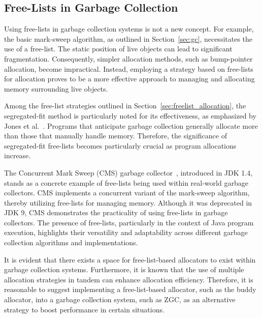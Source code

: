 \subsection{Free-Lists in Garbage Collection}

Using free-lists in garbage collection systems is not a new concept. For example, the basic mark-sweep algorithm, as outlined in Section~\ref{sec:gc}, necessitates the use of a free-list. The static position of live objects can lead to significant fragmentation. Consequently, simpler allocation methods, such as bump-pointer allocation, become impractical. Instead, employing a strategy based on free-lists for allocation proves to be a more effective approach to managing and allocating memory surrounding live objects.

Among the free-list strategies outlined in Section~\ref{sec:freelist_allocation}, the segregated-fit method is particularly noted for its effectiveness, as emphasized by Jones et al.~\cite{gchandbook}. Programs that anticipate garbage collection generally allocate more than those that manually handle memory. Therefore, the significance of segregated-fit free-lists becomes particularly crucial as program allocations increase.

The Concurrent Mark Sweep (CMS) garbage collector~\cite{cms}, introduced in JDK 1.4, stands as a concrete example of free-lists being used within real-world garbage collectors. CMS implements a concurrent variant of the mark-sweep algorithm, thereby utilizing free-lists for managing memory. Although it was deprecated in JDK 9, CMS demonstrates the practicality of using free-lists in garbage collectors. The presence of free-lists, particularly in the context of Java program execution, highlights their versatility and adaptability across different garbage collection algorithms and implementations.

It is evident that there exists a space for free-list-based allocators to exist within garbage collection systems. Furthermore, it is known that the use of multiple allocation strategies in tandem can enhance allocation efficiency. Therefore, it is reasonable to suggest implementing a free-list-based allocator, such as the buddy allocator, into a garbage collection system, such as ZGC, as an alternative strategy to boost performance in certain situations.


